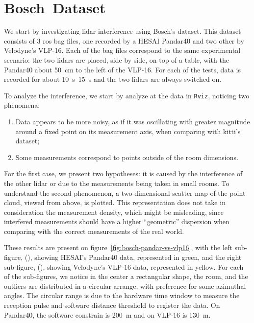\section{Bosch\cp~Dataset}
We start by investigating \ac{lidar} interference using Bosch's dataset. This dataset consists of 3 \ac{ros} bag files, one recorded by a HESAI Pandar40 and two other by Velodyne's VLP-16. Each of the bag files correspond to the same experimental scenario: the two \acp{lidar} are placed, side by side, on top of a table, with the Pandar40 about \SI{50}{\centi\meter} to the left of the VLP-16. For each of the tests, data is recorded for about \SIrange{10}{15}{\second} and the two \acp{lidar} are always switched on.

To analyze the interference, we start by analyze at the data in \texttt{Rviz}, noticing two phenomena: 

\begin{enumerate}
	\item Data appears to be more noisy, as if it was oscillating with greater magnitude around a fixed point on its measurement axis, when comparing with \ac{kitti}'s dataset;
	\item Some measurements correspond to points outside of the room dimensions.
\end{enumerate}

For the first case, we present two hypotheses: it is caused by the interference of the other \ac{lidar} or due to the measurements being taken in small rooms. To understand the second phenomenon, a two-dimensional scatter map of the point cloud, viewed from above, is plotted. This representation does not take in consideration the measurement density, which might be misleading, since interfered measurements should have a higher ``geometric'' dispersion when comparing with the correct measurements of the real world.

These results are present on figure~\ref{fig:bosch-pandar-vs-vlp16}, with the left sub-figure, (), showing HESAI's Pandar40 data, represented in green, and the right sub-figure, (), showing Velodyne's VLP-16 data, represented in yellow. For each of the sub-figures, we notice in the center a rectangular shape, the room, and the outliers are distributed in a circular arrange, with preference for some azimuthal angles. The circular range is due to the hardware time window to measure the reception pulse and software distance threshold to register the data. On Pandar40, the software constrain is \SI{200}{\meter} and on VLP-16 is \SI{130}{\meter}. 

